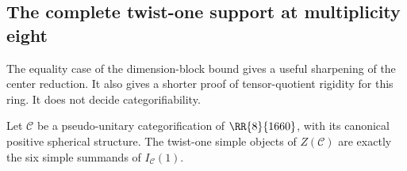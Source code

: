\subsection{The complete twist-one support at multiplicity eight}
\label{subsec:1660-twist-one-support}

The equality case of the dimension-block bound gives a useful sharpening
of the center reduction. It also gives a shorter proof of tensor-quotient
rigidity for this ring. It does not decide categorifiability.

\begin{proposition}\label{prop:1660-twist-one-support}
Let $\mathcal C$ be a pseudo-unitary categorification of $\RR{8}{1660}$,
with its canonical positive spherical structure. The twist-one simple
objects of $Z(\mathcal C)$ are exactly the six simple summands of
$I_{\mathcal C}(1)$.
\end{proposition}

